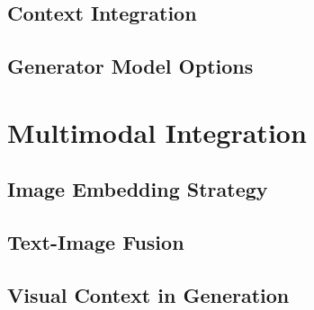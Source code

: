 \subsection{Context Integration}
\label{subsec:methodology:generation:context}

\subsection{Generator Model Options}
\label{subsec:methodology:generation:models}

%
%
\section{Multimodal Integration}
\label{sec:methodology:multimodal}

\subsection{Image Embedding Strategy}
\label{subsec:methodology:multimodal:embedding}

\subsection{Text-Image Fusion}
\label{subsec:methodology:multimodal:fusion}

\subsection{Visual Context in Generation}
\label{subsec:methodology:multimodal:visual}
